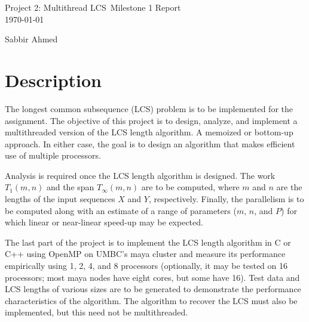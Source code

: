 \documentclass[usletter, 11pt]{extarticle}
\newcommand{\project}{Project 2: Multithread LCS}
\newcommand{\members}{Sabbir Ahmed}
\begin{document}
    \begin{titlepage}

        \vspace*{\fill} %
        \begin{center}

            {\LARGE \project~Milestone 1 Report}\\ [1.5cm]

            \today

            \vspace*{\fill}

            \members

        \end{center}
        \vspace*{\fill} %

    \end{titlepage}

    \section{Description} The longest common subsequence (LCS) problem is to be
    implemented for the assignment. The objective of this project is to design,
    analyze, and implement a multithreaded version of the LCS length algorithm.
    A memoized or bottom-up approach. In either case, the goal is to design an
    algorithm that makes efficient use of multiple processors.

    Analysis is required once the LCS length algorithm is designed. The work
    $T_{1}(m, n)$ and the span $T_{\infty}(m, n)$ are to be computed, where $m$
    and $n$ are the lengths of the input sequences $X$ and $Y$, respectively.
    Finally, the parallelism is to be computed along with an estimate of a
    range of parameters ($m$, $n$, and $P$) for which linear or near-linear
    speed-up may be expected.

    The last part of the project is to implement the LCS length algorithm in C
    or C++ using OpenMP on UMBC's maya cluster and measure its performance
    empirically using 1, 2, 4, and 8 processors (optionally, it may be tested
    on 16 processors; most maya nodes have eight cores, but some have 16). Test
    data and LCS lengths of various sizes are to be generated to demonstrate
    the performance characteristics of the algorithm. The algorithm to recover
    the LCS must also be implemented, but this need not be multithreaded.
\end{document}
